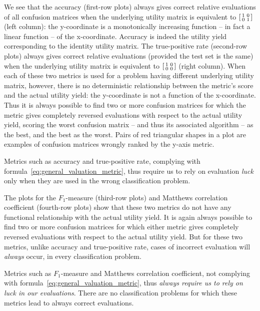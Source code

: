 \documentclass[\ifafour a4paper,12pt,\else a5paper,10pt,\fi%
onecolumn,oneside,article,%
british%
]{memoir}
\theoremstyle{remark}
\theoremstyle{innote}
\renewcommand*{\|}[1][]{\nonscript\:#1\vert\nonscript\:\mathopen{}}
\begin{document}
We see that the accuracy (first-row plots) always gives correct relative evaluations of all confusion matrices when the underlying utility matrix is equivalent to $\begin{bsmallmatrix} 1&0\\0&1 \end{bsmallmatrix}$ (left column): the y-coordinate is a monotonically increasing function -- in fact a linear function -- of the x-coordinate. Accuracy is indeed the utility yield corresponding to the identity utility matrix. The true-positive rate (second-row plots) always gives correct relative evaluations (provided the test set is the same) when the underlying utility matrix is equivalent to $\begin{bsmallmatrix} 1&0\\0&0 \end{bsmallmatrix}$ (right column). When each of these two metrics is used for a problem having different underlying utility matrix, however, there is no deterministic relationship between the metric's score and the actual utility yield: the y-coordinate is not a function of the x-coordinate. Thus it is always possible to find two or more confusion matrices for which the metric gives completely reversed evaluations with respect to the actual utility yield, scoring the worst confusion matrix -- and thus its associated algorithm -- as the best, and the best as the worst. Pairs of red triangular shapes in a plot are examples of confusion matrices wrongly ranked by the y-axis metric.

Metrics such as accuracy and true-positive rate, complying with formula~\eqref{eq:general_valuation_metric}, thus require us to rely on evaluation \emph{luck} only when they are used in the wrong classification problem.

The plots for the $F_{1}$-measure (third-row plots) and Matthews correlation coefficient (fourth-row plots) show that these two metrics do not have any functional relationship with the actual utility yield. It is again always possible to find two or more confusion matrices for which either metric gives completely reversed evaluations with respect to the actual utility yield. But for these two metrics, unlike accuracy and true-positive rate, cases of incorrect evaluation will \emph{always} occur, in every classification problem.

Metrics such as  $F_{1}$-measure and Matthews correlation coefficient, not complying with formula~\eqref{eq:general_valuation_metric}, thus \emph{always require us to rely on luck in our evaluations}. There are no classification problems for which these metrics lead to always correct evaluations.
\end{document}
